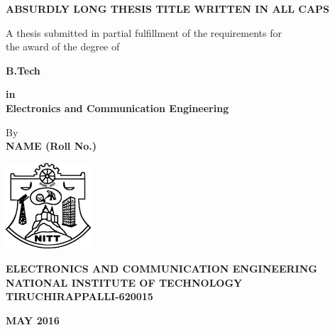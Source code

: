 \begin{titlepage}
\begin{center}
\fontsize{18pt}{1cm}\selectfont \textbf{ABSURDLY LONG THESIS TITLE WRITTEN IN ALL CAPS}

\vspace*{1.3cm}
\fontsize{14pt}{21pt}\selectfont A thesis submitted in partial fulfillment of the requirements for\\
the award of the degree of

\vspace*{0.4cm}
\fontsize{14pt}{1cm}\selectfont\textbf{B.Tech} 

\vspace*{0.4cm}
\textbf{in\\Electronics and Communication Engineering}

\vspace*{2.0cm}
By\\
\textbf{NAME (Roll No.)}

\vspace*{3.2cm}
\includegraphics[width=1.25in]{NITT-Logo}


\fontsize{16pt}{16pt}\selectfont \textbf{ELECTRONICS AND COMMUNICATION ENGINEERING\\NATIONAL INSTITUTE OF TECHNOLOGY\\TIRUCHIRAPPALLI-620015}

\vspace{0.31cm}
\textbf{MAY 2016}
\end{center}
\end{titlepage}

